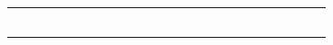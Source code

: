 \documentclass[10pt]{article}
\begin{document}
\begin{center}
\begin{tabular}{|c|c|c|c|c|c|c|c|c|c|c|c|c|c|c|c|c|c|c|c|c|c|c|c|c|}
\hline
 &  &  &  &  &  &  &  &  &  &  &  &  &  &  &  &  &  &  &  &  &  &  &  &  \\
\hline
 &  &  &  &  &  &  &  &  &  &  &  &  &  &  &  &  &  &  &  &  &  &  &  &  \\
\hline
 &  &  &  &  &  &  &  &  &  &  &  &  &  &  &  &  &  &  &  &  &  &  &  &  \\
\hline
 &  &  &  &  &  &  &  &  &  &  &  &  &  &  &  &  &  &  &  &  &  &  &  &  \\
\hline
 &  &  &  &  &  &  &  &  &  &  &  &  &  &  &  &  &  &  &  &  &  &  &  &  \\
\hline
 &  &  &  &  &  &  &  &  &  &  &  &  &  &  &  &  &  &  &  &  &  &  &  &  \\
\hline
 &  &  &  &  &  &  &  &  &  &  &  &  &  &  &  &  &  &  &  &  &  &  &  &  \\
\hline
\end{tabular}
\end{center}
\end{document}
